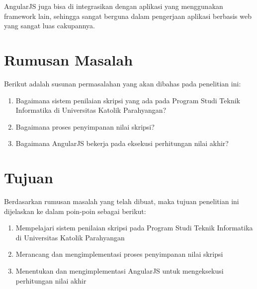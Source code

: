 	AngularJS juga bisa di integrasikan dengan aplikasi yang menggunakan framework lain, sehingga sangat berguna dalam pengerjaan aplikasi berbasis web yang sangat luas cakupannya.
	
\section{Rumusan Masalah}
\label{sec: rumusanMasalah}

	Berikut adalah susunan permasalahan yang akan dibahas pada penelitian ini:
	\begin{enumerate}
		\item Bagaimana sistem penilaian skripsi yang ada pada Program Studi Teknik Informatika di Universitas Katolik Parahyangan?
		\item Bagaimana proses penyimpanan nilai skripsi?
		\item Bagaimana AngularJS bekerja pada eksekusi perhitungan nilai akhir?
	\end{enumerate}

\section{Tujuan}
\label{tujuan}

	Berdasarkan rumusan masalah yang telah dibuat, maka tujuan penelitian ini dijelaskan ke dalam poin-poin sebagai berikut:
	\begin{enumerate}
		\item Mempelajari sistem penilaian skripsi pada Program Studi Teknik Informatika di Universitas Katolik Parahyangan
		\item Merancang dan mengimplementasi proses penyimpanan nilai skripsi
		\item Menentukan dan mengimplementasi AngularJS untuk mengeksekusi perhitungan nilai akhir
	\end{enumerate}